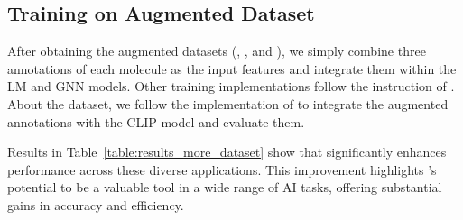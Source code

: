 \subsection{Training on Augmented Dataset}
\label{subsec:appendix_trainng_on_augmented_dataset}

After obtaining the augmented datasets (\bace, \hiv, and \esol), we simply combine three annotations of each molecule as the input features and integrate them within the LM and GNN models. 
Other training implementations follow the instruction of \cite{ZZM24}. 
% 
About the \image dataset, we follow the implementation of \cite{FKIKT23} to integrate the augmented annotations with the CLIP model and evaluate them. 

Results in Table~\ref{table:results_more_dataset} show that \pipeline significantly enhances performance across these diverse applications. 
This improvement highlights \pipeline’s potential to be a valuable tool in a wide range of AI tasks, offering substantial gains in accuracy and efficiency.
